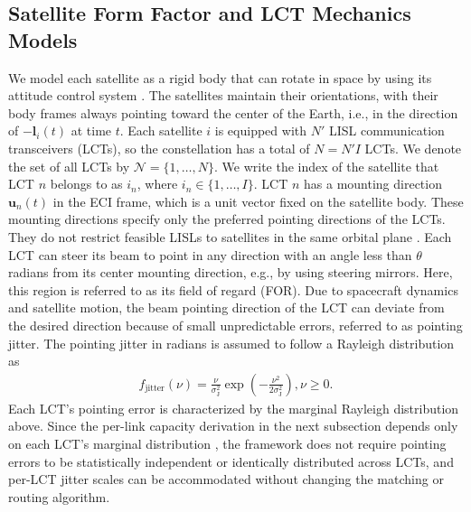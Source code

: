 \documentclass[journal]{IEEEtran}
\begin{document}
\subsection{Satellite Form Factor and LCT Mechanics Models}
We model each satellite as a rigid body that can rotate in space by using its attitude control system \cite{vallado2022fundamentals}.
The satellites maintain their orientations, with their body frames always pointing toward the center of the Earth, i.e., in the direction of $-\mathbf{l}_i(t)$ at time $t$.
Each satellite $i$ is equipped with $N'$ LISL communication transceivers (LCTs), so the constellation has a total of $N=N'I$ LCTs. We denote the set of all LCTs by $\mathcal{N} = \{1,\dots,N\}$.
We write the index of the satellite that LCT $n$ belongs to as $i_n$, where $i_n \in \{1,\dots,I\}$. 
LCT $n$ has a mounting direction $\mathbf{u}_n(t)$ in the ECI frame, which is a unit vector fixed on the satellite body.
These mounting directions specify only the preferred pointing directions of the LCTs. They do not restrict feasible LISLs to satellites in the same orbital plane \cite{chaudhry2021laser,leyva-mayorga2021interplane}.
Each LCT can steer its beam to point in any direction with an angle less than $\theta$ radians from its center mounting direction, e.g., by using steering mirrors. Here, this region is referred to as its field of regard (FOR).
Due to spacecraft dynamics and satellite motion, the beam pointing direction of the LCT can deviate from the desired direction because of small unpredictable errors, referred to as pointing jitter.
The pointing jitter in radians is assumed to follow a Rayleigh distribution \cite{arnon2003effects} as
\begin{equation}\label{eq:pointing_jitter}
  \begin{aligned}
    f_{\text{jitter}}(\nu) = \frac{\nu}{\sigma^2_{\mathrm{J}}} \exp\left(-\frac{\nu^2}{2\sigma^2_{\mathrm{J}}}\right), \nu \geq 0.
  \end{aligned}
\end{equation}
Each LCT's pointing error is characterized by the marginal Rayleigh distribution above. Since the per-link capacity derivation in the next subsection depends only on each LCT's marginal distribution \cite{kaymak2018survey,yang2024analysis}, the framework does not require pointing errors to be statistically independent or identically distributed across LCTs, and per-LCT jitter scales can be accommodated without changing the matching or routing algorithm.
\end{document}
